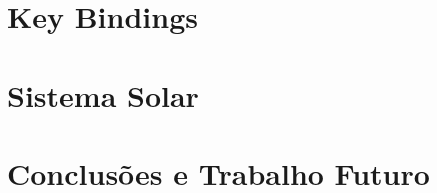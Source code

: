 \documentclass[a4paper]{article}
\begin{document}
\section{Key Bindings}


\section{Sistema Solar}



\section{Conclusões e Trabalho Futuro}
\end{document}
